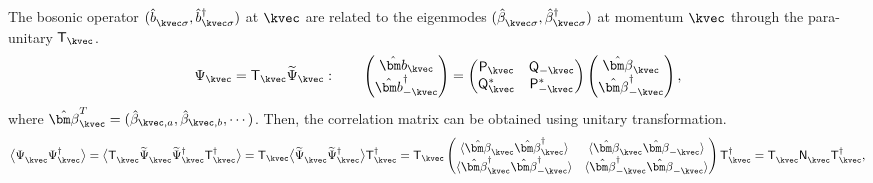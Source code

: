The bosonic operator $(\hat{b}_{\kvec\sigma}^{\phantom \dagger}, \hat{b}_{\kvec\sigma}^{\dagger} )$ at $\kvec$ are related to the eigenmodes $(\hat{\beta}_{\kvec\sigma}^{\phantom \dagger}, \hat{\beta}_{\kvec\sigma}^{\dagger} )$ at momentum $\kvec$ through the para-unitary $\mathsf{T}_{\kvec}$. 
\begin{equation}
    \Psi_{\kvec} = \mathsf{T}_{\kvec} \widetilde{\Psi}_{\kvec}: \qquad
    \begin{pmatrix}
        \hat{\bm b}_{\kvec} \\ 
        \hat{\bm b}^{\dagger}_{-\kvec}
    \end{pmatrix}
    = 
    \begin{pmatrix}
        \mathsf{P}_{\kvec}           & \mathsf{Q}_{-\kvec}        \\
        \mathsf{Q}_{\kvec}^{*}       & \mathsf{P}_{-\kvec}^{*}
    \end{pmatrix}
    \begin{pmatrix}
        \hat{\bm\beta}_{\kvec} \\
        \hat{\bm\beta}_{-\kvec}^{\dagger}
    \end{pmatrix},
\end{equation}
where $\hat{\bm\beta}_{\kvec}^{T} = (\hat{\beta}_{\kvec,a}, \hat{\beta}_{\kvec,b}, \cdots)$.
Then, the correlation matrix can be obtained using unitary transformation.
\begin{equation}
    \big 
    \langle \Psi_{\kvec}^{\phantom \dagger} \Psi_{\kvec}^{\dagger} 
    \big \rangle 
    = 
    \big\langle 
    \mathsf{T}_{\kvec}^{\phantom\dagger} \widetilde{\Psi}_{\kvec}^{\phantom\dagger} \widetilde{\Psi}_{\kvec}^{\dagger} \mathsf{T}_{\kvec}^{\dagger} 
    \big\rangle
    = 
    \mathsf{T}_{\kvec} \big\langle \widetilde{\Psi}_{\kvec}^{\phantom\dagger} \widetilde{\Psi}_{\kvec}^{\dagger}  \big \rangle \mathsf{T}_{\kvec}^{\dagger}
    = 
    \mathsf{T}_{\kvec} 
    \begin{pmatrix}
            \langle \hat{\bm \beta}_{ \kvec}^{\phantom \dagger} \hat{\bm \beta}_{ \kvec}^{\dagger}          \rangle            
        &   \langle \hat{\bm \beta}_{ \kvec}^{\phantom \dagger} \hat{\bm \beta}_{-\kvec}^{\phantom \dagger} \rangle\\
            \langle \hat{\bm \beta}_{ \kvec}^{\dagger}          \hat{\bm \beta}_{-\kvec}^{\dagger}          \rangle  
        &   \langle \hat{\bm \beta}_{-\kvec}^{\dagger}          \hat{\bm \beta}_{-\kvec}^{\phantom \dagger} \rangle
    \end{pmatrix}
    \mathsf{T}_{\kvec}^{\dagger}
    =\mathsf{T}_{\kvec}^{\phantom \dagger} \mathsf{N}_{\kvec}^{\phantom \dagger} \mathsf{T}_{\kvec}^{\dagger},
\end{equation}
